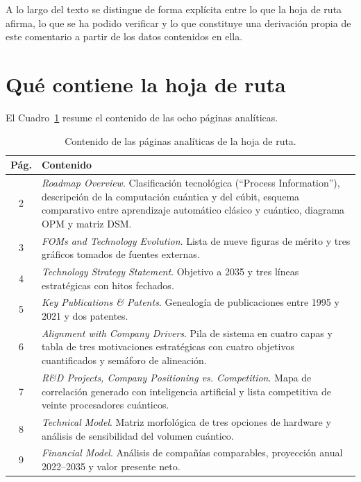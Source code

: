 \documentclass[11pt,letterpaper]{article}
\begin{document}
A lo largo del texto se distingue de forma explícita entre lo que la hoja de
ruta afirma, lo que se ha podido verificar y lo que constituye una derivación
propia de este comentario a partir de los datos contenidos en ella.

\section{Qué contiene la hoja de ruta}

El Cuadro~\ref{tab:contenido} resume el contenido de las ocho páginas
analíticas.

\begin{table}[ht]
  \centering
  \small
  \caption{Contenido de las páginas analíticas de la hoja de ruta.}
  \label{tab:contenido}
  \begin{tabularx}{\textwidth}{@{}c>{\raggedright\arraybackslash}X@{}}
    \toprule
    \textbf{Pág.} & \textbf{Contenido} \\
    \midrule
    2 & \emph{Roadmap Overview}. Clasificación tecnológica
        (\enquote{Process Information}), descripción de la computación cuántica
        y del cúbit, esquema comparativo entre aprendizaje automático clásico y
        cuántico, diagrama OPM y matriz DSM. \\
    3 & \emph{FOMs and Technology Evolution}. Lista de nueve figuras de mérito
        y tres gráficos tomados de fuentes externas. \\
    4 & \emph{Technology Strategy Statement}. Objetivo a 2035 y tres líneas
        estratégicas con hitos fechados. \\
    5 & \emph{Key Publications \& Patents}. Genealogía de publicaciones entre
        1995 y 2021 y dos patentes. \\
    6 & \emph{Alignment with Company Drivers}. Pila de sistema en cuatro capas
        y tabla de tres motivaciones estratégicas con cuatro objetivos
        cuantificados y semáforo de alineación. \\
    7 & \emph{R\&D Projects, Company Positioning vs. Competition}. Mapa de
        correlación generado con inteligencia artificial y lista competitiva
        de veinte procesadores cuánticos. \\
    8 & \emph{Technical Model}. Matriz morfológica de tres opciones de
        hardware y análisis de sensibilidad del volumen cuántico. \\
    9 & \emph{Financial Model}. Análisis de compañías comparables, proyección
        anual 2022--2035 y valor presente neto. \\
    \bottomrule
  \end{tabularx}
\end{table}
\end{document}
